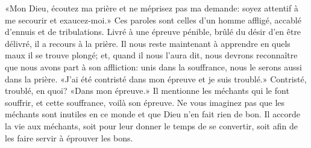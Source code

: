 «Mon Dieu, écoutez ma prière et ne méprisez pas ma demande:
	soyez attentif à me secourir et exaucez-moi.»
Ces paroles sont celles d’un homme affligé,
	accablé d’ennuis et de tribulations.
Livré à une épreuve pénible, brûlé du désir d’en être délivré,
	il a recours à la prière.
Il nous reste maintenant à apprendre en quels maux il se trouve plongé;
	et, quand il nous l’aura dit,
	nous devrons reconnaître que nous avons part à son affliction:
	unis dans la souffrance, nous le serons aussi dans la prière.
«J’ai été contristé dans mon épreuve et je suis troublé.»
Contristé, troublé, en quoi? «Dans mon épreuve.»
Il mentionne les méchants qui le font souffrir,
	et cette souffrance, voilà son épreuve.
Ne vous imaginez pas que les méchants sont inutiles en ce monde
	et que Dieu n’en fait rien de bon.
Il accorde la vie aux méchants,
	soit pour leur donner le temps de se convertir,
	soit afin de les faire servir à éprouver les bons.
